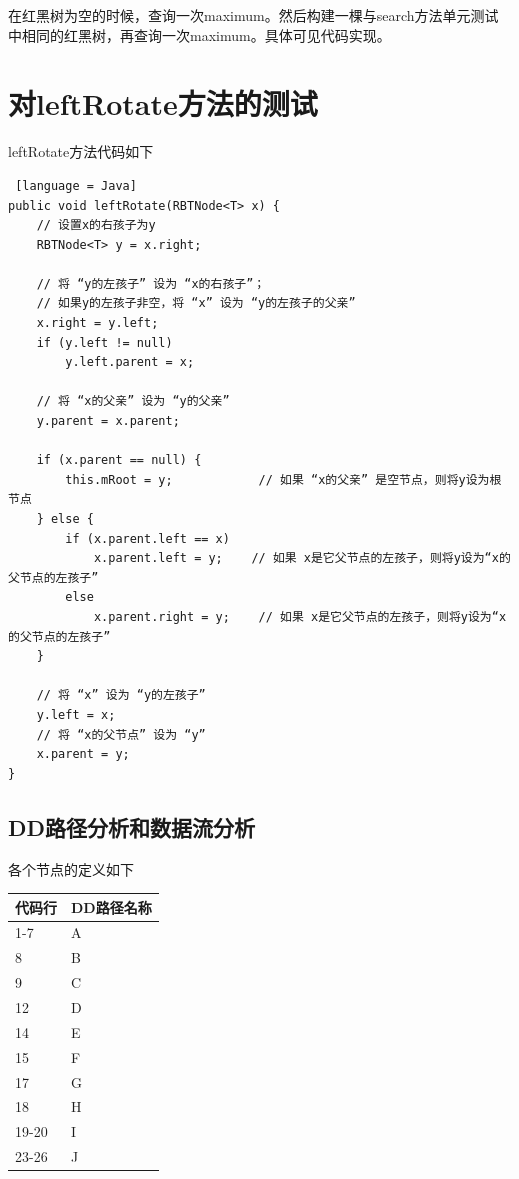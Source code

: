\documentclass[12pt, a4paper, oneside]{ctexart}
\begin{document}
在红黑树为空的时候，查询一次maximum。然后构建一棵与search方法单元测试中相同的红黑树，再查询一次maximum。具体可见代码实现。

\section{对leftRotate方法的测试}

leftRotate方法代码如下

\begin{lstlisting} [language = Java]
public void leftRotate(RBTNode<T> x) {
    // 设置x的右孩子为y
    RBTNode<T> y = x.right;

    // 将 “y的左孩子” 设为 “x的右孩子”；
    // 如果y的左孩子非空，将 “x” 设为 “y的左孩子的父亲”
    x.right = y.left;
    if (y.left != null)
        y.left.parent = x;

    // 将 “x的父亲” 设为 “y的父亲”
    y.parent = x.parent;

    if (x.parent == null) {
        this.mRoot = y;            // 如果 “x的父亲” 是空节点，则将y设为根节点
    } else {
        if (x.parent.left == x)
            x.parent.left = y;    // 如果 x是它父节点的左孩子，则将y设为“x的父节点的左孩子”
        else
            x.parent.right = y;    // 如果 x是它父节点的左孩子，则将y设为“x的父节点的左孩子”
    }
    
    // 将 “x” 设为 “y的左孩子”
    y.left = x;
    // 将 “x的父节点” 设为 “y”
    x.parent = y;
}
\end{lstlisting}

\subsection{DD路径分析和数据流分析}

各个节点的定义如下

\begin{table}[!h]
    \begin{tabular}{|l|l|}
    \hline
    代码行 & DD路径名称\\ \hline
    1-7 & A\\ \hline
    8 & B\\ \hline
    9 & C \\ \hline
    12 & D \\ \hline
    14 & E \\ \hline
    15 & F \\ \hline
    17 & G \\ \hline
    18 & H \\ \hline
    19-20 & I \\ \hline
    23-26 & J \\ \hline
    \end{tabular}
\end{table}
\end{document}

